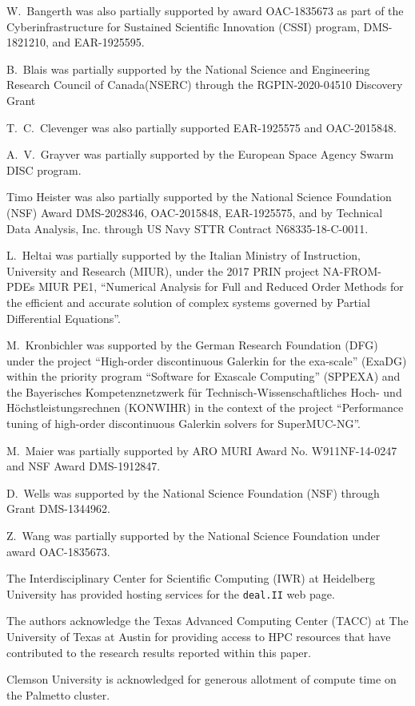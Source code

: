 \documentclass{ansarticle-preprint}
\newcommand{\specialword}[1]{\texttt{#1}}
\newcommand{\dealii}{{\specialword{deal.II}}\xspace}
\begin{document}
W.~Bangerth was also partially supported by award OAC-1835673 as part of the Cyberinfrastructure for Sustained Scientific Innovation (CSSI)
program, DMS-1821210,
and EAR-1925595.


B.~Blais was partially supported by the National Science and Engineering Research Council of Canada(NSERC)  through the RGPIN-2020-04510 Discovery Grant

T.~C.~Clevenger was also partially supported EAR-1925575 and OAC-2015848.

A.~V.~Grayver was partially supported by the European Space Agency
Swarm DISC program.

Timo Heister was also partially supported by the National Science Foundation (NSF)
Award DMS-2028346, OAC-2015848, EAR-1925575, and by
Technical Data Analysis, Inc. through US Navy STTR Contract N68335-18-C-0011.

L.~Heltai was partially supported by the Italian Ministry of Instruction,
University and Research (MIUR), under the 2017 PRIN project NA-FROM-PDEs MIUR
PE1, ``Numerical Analysis for Full and Reduced Order Methods for the efficient
and accurate solution of complex systems governed by Partial Differential
Equations''.

M.~Kronbichler was supported by the German
Research Foundation (DFG) under the project ``High-order discontinuous
Galerkin for the exa-scale'' (\mbox{ExaDG}) within the priority program ``Software
for Exascale Computing'' (SPPEXA) and the Bayerisches Kompetenznetzwerk
f\"ur Technisch-Wissen\-schaft\-li\-ches Hoch- und H\"ochstleistungsrechnen
(KONWIHR) in the context of the project
``Performance tuning of high-order discontinuous Galerkin solvers for
SuperMUC-NG''.

M.~Maier was partially supported by ARO MURI Award No. W911NF-14-0247 and
NSF Award DMS-1912847.

D.~Wells was supported by the National Science Foundation (NSF) through Grant
DMS-1344962.

Z.~Wang was partially
supported by the National Science Foundation under award OAC-1835673.

The Interdisciplinary Center for Scientific Computing (IWR) at Heidelberg
University has provided hosting services for the \dealii{} web page.


The authors acknowledge the Texas Advanced Computing Center (TACC) at The
University of Texas at Austin for providing access to HPC resources that have
contributed to the research results reported within this paper.

Clemson University is acknowledged for generous allotment of compute time on
the Palmetto cluster.


{}

\end{document}
